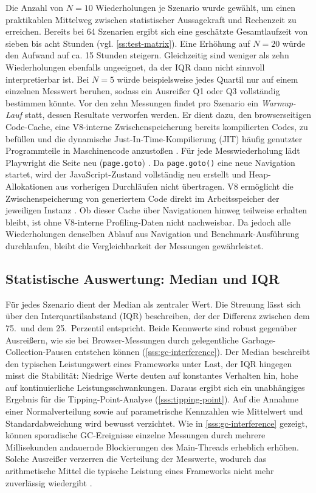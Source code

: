 Die Anzahl von  $N = 10$  Wiederholungen je Szenario wurde gewählt, um einen praktikablen Mittelweg zwischen statistischer Aussagekraft und Rechenzeit zu erreichen. Bereits bei 64 Szenarien ergibt sich eine geschätzte Gesamtlaufzeit von sieben bis acht Stunden (vgl. \cref{ss:test-matrix}). Eine Erhöhung auf $N = 20$ würde den Aufwand auf ca. 15 Stunden steigern. Gleichzeitig sind weniger als zehn Wiederholungen ebenfalls ungeeignet, da der IQR dann nicht sinnvoll interpretierbar ist. Bei $N = 5$ würde beispielsweise jedes Quartil nur auf einem einzelnen Messwert beruhen, sodass ein Ausreißer Q1 oder Q3 vollständig bestimmen könnte. Vor den zehn Messungen findet pro Szenario ein \textit{Warmup-Lauf} statt, dessen Resultate verworfen werden. Er dient dazu, den browserseitigen Code-Cache, eine V8-interne Zwischenspeicherung bereits kompilierten Codes, zu befüllen \cite{alle-v8-caching-2018} und die dynamische Just-In-Time-Kompilierung (JIT) häufig genutzter Programmteile in Maschinencode anzustoßen \cite{barrett-warmup-2017}. Für jede Messwiederholung lädt Playwright die Seite neu (\texttt{page.goto}) \cite{playwright-navigations}. Da \texttt{page.goto()} eine neue Navigation startet, wird der JavaScript-Zustand vollständig neu erstellt und Heap-Allokationen aus vorherigen Durchläufen nicht übertragen. V8 ermöglicht die Zwischenspeicherung von generiertem Code direkt im Arbeitsspeicher der jeweiligen Instanz \cite{alle-v8-caching-2018}. Ob dieser Cache über Navigationen hinweg teilweise erhalten bleibt, ist ohne V8-interne Profiling-Daten nicht nachweisbar. Da jedoch alle Wiederholungen denselben Ablauf aus Navigation und Benchmark-Ausführung durchlaufen, bleibt die Vergleichbarkeit der Messungen gewährleistet.

\subsection{Statistische Auswertung: Median und IQR}
\label{ss:statistical-evaluation}

Für jedes Szenario dient der Median als zentraler Wert. Die Streuung lässt sich über den Interquartilsabstand (IQR) beschreiben, der der Differenz zwischen dem 75.\ und dem 25.\ Perzentil entspricht. Beide Kennwerte sind robust gegenüber Ausreißern, wie sie bei Browser-Messungen durch gelegentliche Garbage-Collection-Pausen entstehen können (\cref{sss:gc-interference}). Der Median beschreibt den typischen Leistungswert eines Frameworks unter Last, der IQR hingegen misst die Stabilität: Niedrige Werte deuten auf konstantes Verhalten hin, hohe auf kontinuierliche Leistungsschwankungen. Daraus ergibt sich ein unabhängiges Ergebnis für die Tipping-Point-Analyse (\cref{sss:tipping-point}). Auf die Annahme einer Normalverteilung sowie auf parametrische Kennzahlen wie Mittelwert und Standardabweichung wird bewusst verzichtet. Wie in \cref{sss:gc-interference} gezeigt, können sporadische GC-Ereignisse einzelne Messungen durch mehrere Millisekunden andauernde Blockierungen des Main-Threads erheblich erhöhen. Solche Ausreißer verzerren die Verteilung der Messwerte, wodurch das arithmetische Mittel die typische Leistung eines Frameworks nicht mehr zuverlässig wiedergibt \cite{huber-robust-1981}.

